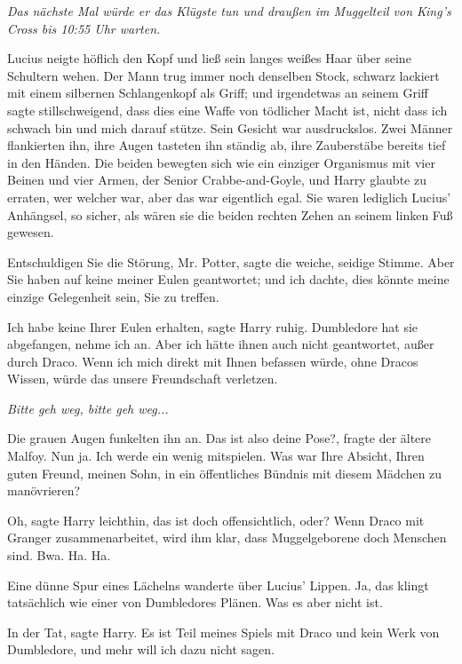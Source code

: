 \emph{Das nächste Mal würde er das Klügste tun und draußen im Muggelteil von
King's Cross bis 10:55 Uhr warten.}

Lucius neigte höflich den Kopf und ließ sein langes weißes Haar über seine
Schultern wehen. Der Mann trug immer noch denselben Stock, schwarz lackiert mit
einem silbernen Schlangenkopf als Griff; und irgendetwas an seinem Griff sagte
stillschweigend, dass dies eine Waffe von tödlicher Macht ist, nicht dass ich
schwach bin und mich darauf stütze. Sein Gesicht war ausdruckslos. Zwei Männer
flankierten ihn, ihre Augen tasteten ihn ständig ab, ihre Zauberstäbe bereits
tief in den Händen. Die beiden bewegten sich wie ein einziger Organismus mit
vier Beinen und vier Armen, der Senior Crabbe-and-Goyle, und Harry glaubte zu
erraten, wer welcher war, aber das war eigentlich egal. Sie waren lediglich
Lucius' Anhängsel, so sicher, als wären sie die beiden rechten Zehen an seinem
linken Fuß gewesen.

\glqq{}Entschuldigen Sie die Störung, Mr. Potter\grqq{}, sagte die weiche,
seidige Stimme. \glqq{}Aber Sie haben auf keine meiner Eulen geantwortet; und
ich dachte, dies könnte meine einzige Gelegenheit sein, Sie zu treffen.\grqq{}

\glqq{}Ich habe keine Ihrer Eulen erhalten\grqq{}, sagte Harry ruhig. \glqq{}
Dumbledore hat sie abgefangen, nehme ich an. Aber ich hätte ihnen auch nicht
geantwortet, außer durch Draco. Wenn ich mich direkt mit Ihnen befassen würde,
ohne Dracos Wissen, würde das unsere Freundschaft verletzen.\grqq{}

\emph{Bitte geh weg, bitte geh weg...}

Die grauen Augen funkelten ihn an. \glqq{}Das ist also deine Pose?\grqq{},
fragte der ältere Malfoy. \glqq{}Nun ja. Ich werde ein wenig mitspielen. Was war
Ihre Absicht, Ihren guten Freund, meinen Sohn, in ein öffentliches Bündnis mit
diesem Mädchen zu manövrieren?\grqq{}

\glqq{}Oh\grqq{}, sagte Harry leichthin, \glqq{}das ist doch offensichtlich,
oder? Wenn Draco mit Granger zusammenarbeitet, wird ihm klar, dass
Muggelgeborene doch Menschen sind. Bwa. Ha. Ha.\grqq{}

Eine dünne Spur eines Lächelns wanderte über Lucius' Lippen. \glqq{}Ja, das
klingt tatsächlich wie einer von Dumbledores Plänen. Was es aber nicht ist.\grqq{}

\glqq{}In der Tat\grqq{}, sagte Harry. \glqq{}Es ist Teil meines Spiels mit
Draco und kein Werk von Dumbledore, und mehr will ich dazu nicht sagen.\grqq{}

